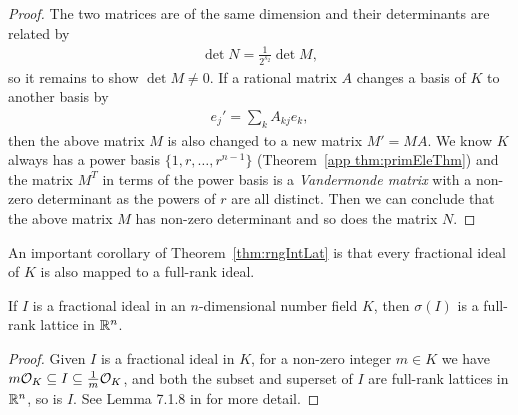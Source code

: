 \documentclass[../main.tex]{subfiles}
\begin{document}
\begin{proof}
	The two matrices are of the same dimension and their determinants are related by 
	\begin{align}
	\label{eq:detN}
		\det N = \frac{1}{2^{s_2}}\det M,
	\end{align}
	so it remains to show $\det M \neq 0$. If a rational matrix $A$ changes a basis of $K$ to another basis by 
	\begin{align*}
		e_j'=\sum_{k} A_{kj} e_k,
	\end{align*}
	then the above matrix $M$ is also changed to a new matrix $M'=M A$. %
	We know $K$ always has a power basis $\{1, r, \dots, r^{n-1}\}$ (Theorem~\ref{app thm:primEleThm}) 
	and the matrix $M^T$ in terms of the power basis is a \textit{Vandermonde matrix} with a non-zero determinant as the powers of $r$ are all distinct. Then we can conclude that the above matrix $M$ has non-zero determinant and so does the matrix $N$. 
\end{proof}

An important corollary of Theorem~\ref{thm:rngIntLat} is that every fractional ideal of $K$ is also mapped to a full-rank ideal. 

\begin{corollary}
If $I$ is a fractional ideal in an $n$-dimensional number field $K$, then $\sigma(I)$ is a full-rank lattice in $\mathbb{R}^n$.
\end{corollary}
\begin{proof}
Given $I$ is a fractional ideal in $K$, for a non-zero integer $m \in K$ we have $m \mathcal{O}_K \subseteq I \subseteq \frac{1}{m}\mathcal{O}_K$, and both the subset and superset of $I$ are full-rank lattices in $\mathbb{R}^n$, so is $I$. See Lemma 7.1.8 in \cite{stein2012algebraic} for more detail. 
\end{proof}
\end{document}
